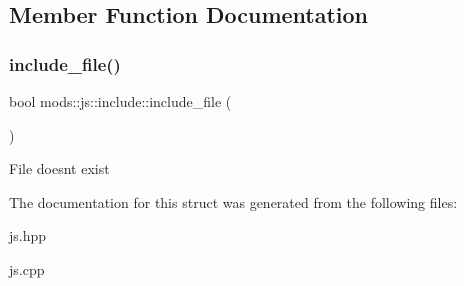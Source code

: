 \subsection{Member Function Documentation}
\mbox{\label{structmods_1_1js_1_1include_afed2b4e711b0b0100f3083921591ba25}} 
\subsubsection{\texorpdfstring{include\+\_\+file()}{include\_file()}}
{\footnotesize\ttfamily bool mods\+::js\+::include\+::include\+\_\+file (\begin{DoxyParamCaption}{ }\end{DoxyParamCaption})}

File doesn\textquotesingle{}t exist 

The documentation for this struct was generated from the following files\+:\begin{DoxyCompactItemize}
\item 
js.\+hpp\item 
js.\+cpp\end{DoxyCompactItemize}
